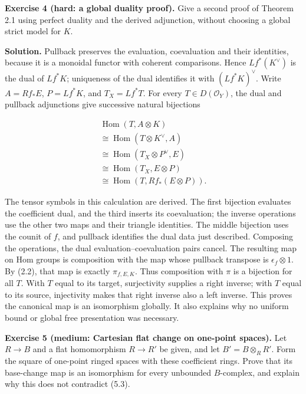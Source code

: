 \documentclass[
  english,
  11pt,
  a4paper,
]{article}
\begin{document}
\textbf{Exercise 4 (hard: a global duality proof).} Give a second proof
of Theorem 2.1 using perfect duality and the derived adjunction, without
choosing a global strict model for \(K\).

\textbf{Solution.} Pullback preserves the evaluation, coevaluation and
their identities, because it is a monoidal functor with coherent
comparisons. Hence \(Lf^*(K^\vee)\) is the dual of \(Lf^*K\); uniqueness
of the dual identifies it with \((Lf^*K)^\vee\). Write \(A=Rf_*E\),
\(P=Lf^*K\), and \(T_X=Lf^*T\). For every \(T\in D(\mathcal O_Y)\), the
dual and pullback adjunctions give successive natural bijections

\[\begin{gathered}
\operatorname{Hom}(T,A\otimes K)\\
\cong\operatorname{Hom}(T\otimes K^\vee,A)\\
\cong\operatorname{Hom}(T_X\otimes P^\vee,E)\\
\cong\operatorname{Hom}(T_X,E\otimes P)\\
\cong\operatorname{Hom}(T,Rf_*(E\otimes P)).
\end{gathered}
\tag{6.2}\]

The tensor symbols in this calculation are derived. The first bijection
evaluates the coefficient dual, and the third inserts its coevaluation;
the inverse operations use the other two maps and their triangle
identities. The middle bijection uses the counit of \(f\), and pullback
identifies the dual data just described. Composing the operations, the
dual evaluation--coevaluation pairs cancel. The resulting map on Hom
groups is composition with the map whose pullback transpose is
\(\epsilon_f\otimes1\). By (2.2), that map is exactly \(\pi_{f,E,K}\).
Thus composition with \(\pi\) is a bijection for all \(T\). With \(T\)
equal to its target, surjectivity supplies a right inverse; with \(T\)
equal to its source, injectivity makes that right inverse also a left
inverse. This proves the canonical map is an isomorphism globally. It
also explains why no uniform bound or global free presentation was
necessary.

\textbf{Exercise 5 (medium: Cartesian flat change on one-point spaces).}
Let \(R\to B\) and a flat homomorphism \(R\to R'\) be given, and let
\(B'=B\otimes_RR'\). Form the square of one-point ringed spaces with
these coefficient rings. Prove that its base-change map is an
isomorphism for every unbounded \(B\)-complex, and explain why this does
not contradict (5.3).
\end{document}
